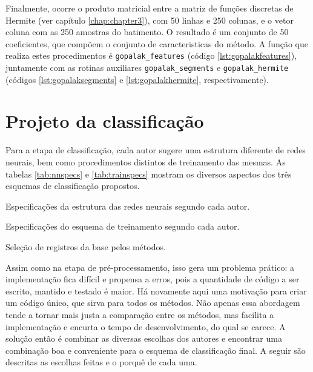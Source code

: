 Finalmente, ocorre o produto matricial entre a matriz de funções discretas de Hermite (ver capítulo \ref{chap:chapter3}), com 50 linhas e 250 colunas, e o vetor coluna com as 250 amostras do batimento. O resultado é um conjunto de 50 coeficientes, que compõem o conjunto de caracteristicas do método. A função que realiza estes procedimentos é \texttt{gopalak\_features} (código \ref{lst:gopalakfeatures}), juntamente com as rotinas auxiliares \texttt{gopalak\_segments} e \texttt{gopalak\_hermite} (códigos \ref{lst:gopalaksegments} e \ref{lst:gopalakhermite}, respectivamente).

\section{Projeto da classificação}

Para a etapa de classificação, cada autor sugere uma estrutura diferente de redes neurais, bem como procedimentos distintos de treinamento das mesmas. As tabelas \ref{tab:nnspecs} e \ref{tab:trainspecs} mostram os diversos aspectos dos três esquemas de classificação propostos.

\begin{table}[ht!]
    \centering
    
    \caption[Especificações da estrutura das redes neurais segundo cada autor]{Especificações da estrutura das redes neurais segundo cada autor.}
    \label{tab:nnspecs}
\end{table}

\begin{table}[ht!]
    \centering
    
    \caption[Especificações do esquema de treinamento segundo cada autor]{Especificações do esquema de treinamento segundo cada autor.}
    \label{tab:trainspecs}
\end{table}

\begin{table}[ht!]
    \centering
    
    \caption[Seleção de registros da base pelos métodos]{Seleção de registros da base pelos métodos.}
    \label{tab:selection}
\end{table}

Assim como na etapa de pré-processamento, isso gera um problema prático: a implementação fica difícil e propensa a erros, pois a quantidade de código a ser escrito, mantido e testado é maior. Há novamente aqui uma motivação para criar um código único, que sirva para todos os métodos. Não apenas essa abordagem tende a tornar mais justa a comparação entre os métodos, mas facilita a implementação e encurta o tempo de desenvolvimento, do qual se carece. A solução então é combinar as diversas escolhas dos autores e encontrar uma combinação boa e conveniente para o esquema de classificação final. A seguir são descritas as escolhas feitas e o porquê de cada uma.

